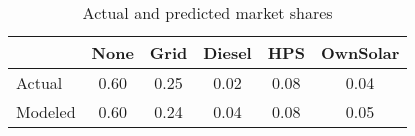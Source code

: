 \begin{table}[htbp]\centering
\caption{Actual and predicted market shares\label {predict}}
\begin{tabular}{l*{5}{c}}
\toprule
                 &        None&        Grid&      Diesel&         HPS&    OwnSolar\\
\midrule
Actual           &        0.60&        0.25&        0.02&        0.08&        0.04\\
Modeled          &  0.60&        0.24&        0.04&       0.08&     0.05\\

\bottomrule
\end{tabular}
\end{table}